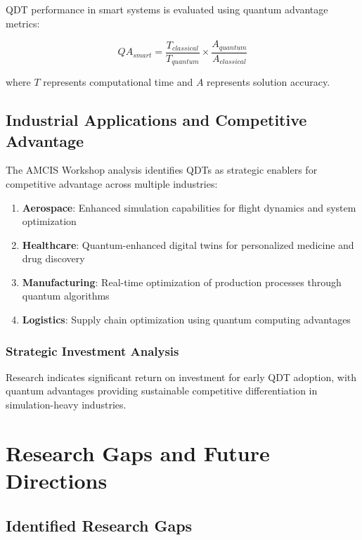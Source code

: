 QDT performance in smart systems is evaluated using quantum advantage metrics:

\begin{equation}
QA_{smart} = \frac{T_{classical}}{T_{quantum}} \times \frac{A_{quantum}}{A_{classical}}
\end{equation}

where $T$ represents computational time and $A$ represents solution accuracy.

\subsection{Industrial Applications and Competitive Advantage}

The AMCIS Workshop analysis \cite{amcis2022quantum} identifies QDTs as strategic enablers for competitive advantage across multiple industries:

\begin{enumerate}
    \item \textbf{Aerospace}: Enhanced simulation capabilities for flight dynamics and system optimization
    \item \textbf{Healthcare}: Quantum-enhanced digital twins for personalized medicine and drug discovery
    \item \textbf{Manufacturing}: Real-time optimization of production processes through quantum algorithms
    \item \textbf{Logistics}: Supply chain optimization using quantum computing advantages
\end{enumerate}

\subsubsection{Strategic Investment Analysis}

Research indicates significant return on investment for early QDT adoption, with quantum advantages providing sustainable competitive differentiation in simulation-heavy industries.

\section{Research Gaps and Future Directions}

\subsection{Identified Research Gaps}


